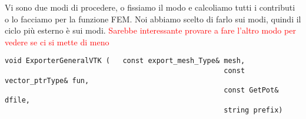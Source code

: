 Vi sono due modi di procedere, o fissiamo il modo e calcoliamo tutti i contributi o lo facciamo per la funzione FEM.
Noi abbiamo scelto di farlo sui modi, quindi il ciclo pi\`u esterno \`e sui modi.
\textcolor{red}{Sarebbe interessante provare a fare l'altro modo per vedere se ci si mette di meno}

\begin{lstlisting}[style = general]
void ExporterGeneralVTK (	const export_mesh_Type& mesh,
													const vector_ptrType& fun,
													const GetPot& dfile,
													string prefix)
\end{lstlisting}


